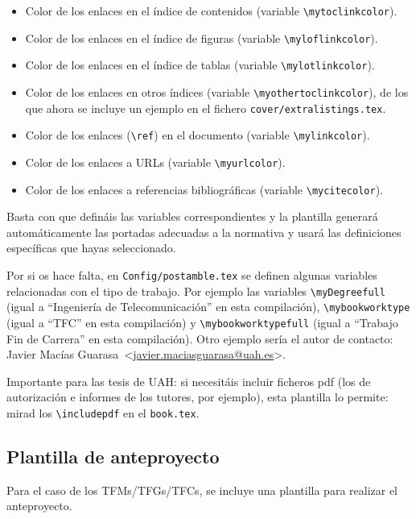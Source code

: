 \documentclass[spanish,openright]{book}
\makeatletter
\newcommand{\myDegree}{GITT}
\newcommand{\myAuthorName}{Javier}
\newcommand{\myAuthorSurname}{Macías Guarasa}
\newcommand{\myAuthorFullName}{\myAuthorName{} \myAuthorSurname{}}
\newcommand{\myAuthorEmail}{javier.maciasguarasa@uah.es}
\newcommand{\myResearchGroup}{GEINTRA}
\newcommand{\myDegreefull}{Ingeniería de Telecomunicación}
\newcommand{\mybookworktype}{TFC}
\newcommand{\mybookworktypefull}{Trabajo Fin de Carrera}
\newcommand{\mybookworktypefull}{Trabajo Fin de Carrera}
\newcommand{\myDegreefull}{Ingeniería Electrónica}
\newcommand{\mybookworktype}{TFC}
\newcommand{\mybookworktypefull}{Trabajo Fin de Carrera}
\newcommand{\mybookworktypefull}{Trabajo Fin de Carrera}
\newcommand{\myDegreefull}{Ingeniería Técnica de Telecomunicación, especialidad en Sistemas Electrónicos}
\newcommand{\mybookworktype}{TFC}
\newcommand{\mybookworktypefull}{Trabajo Fin de Carrera}
\newcommand{\mybookworktypefull}{Trabajo Fin de Carrera}
\newcommand{\myDegreefull}{Ingeniería Técnica de Telecomunicación, especialidad en Sistemas de Telecomunicación}
\newcommand{\mybookworktype}{TFC}
\newcommand{\mybookworktypefull}{Trabajo Fin de Carrera}
\newcommand{\mybookworktypefull}{Trabajo Fin de Carrera}
\newcommand{\myDegreefull}{Ingeniería Técnica Industrial, especialidad en Electrónica Industrial}
\newcommand{\mybookworktype}{TFC}
\newcommand{\mybookworktypefull}{Trabajo Fin de Carrera}
\newcommand{\mybookworktypefull}{Trabajo Fin de Carrera}
\newcommand{\myDegreefull}{Grado en Ingeniería Electrónica de Comunicaciones}
\newcommand{\mybookworktype}{TFG}
\newcommand{\mybookworktypefull}{Trabajo Fin de Grado}
\newcommand{\mybookworktypefull}{Trabajo Fin de Grado}
\newcommand{\myDegreefull}{Grado en Ingeniería en Electrónica y Automática Industrial}
\newcommand{\mybookworktype}{TFG}
\newcommand{\mybookworktypefull}{Trabajo Fin de Grado}
\newcommand{\mybookworktypefull}{Trabajo Fin de Grado}
\newcommand{\myDegreefull}{Grado en Ingeniería en Sistemas de Telecomunicación}
\newcommand{\mybookworktype}{TFG}
\newcommand{\mybookworktypefull}{Trabajo Fin de Grado}
\newcommand{\mybookworktypefull}{Trabajo Fin de Grado}
\newcommand{\myDegreefull}{Grado en Ingeniería en Tecnologías de la Telecomunicación}
\newcommand{\mybookworktype}{TFG}
\newcommand{\mybookworktypefull}{Trabajo Fin de Grado}
\newcommand{\mybookworktypefull}{Trabajo Fin de Grado}
\newcommand{\myDegreefull}{Grado en Ingeniería Telemática}
\newcommand{\mybookworktype}{TFG}
\newcommand{\mybookworktypefull}{Trabajo Fin de Grado}
\newcommand{\mybookworktypefull}{Trabajo Fin de Grado}
\newcommand{\myDegreefull}{Grado en Ingeniería de Computadores}
\newcommand{\mybookworktype}{TFG}
\newcommand{\mybookworktypefull}{Trabajo Fin de Grado}
\newcommand{\mybookworktypefull}{Trabajo Fin de Grado}
\newcommand{\myDegreefull}{Grado en Ingeniería Informática}
\newcommand{\mybookworktype}{TFG}
\newcommand{\mybookworktypefull}{Trabajo Fin de Grado}
\newcommand{\mybookworktypefull}{Trabajo Fin de Grado}
\newcommand{\myDegreefull}{Grado en Sistemas de Información}
\newcommand{\mybookworktype}{TFG}
\newcommand{\mybookworktypefull}{Trabajo Fin de Grado}
\newcommand{\mybookworktypefull}{Trabajo Fin de Grado}
\newcommand{\myDegreefull}{Máster Universitario en Sistemas Electrónicos Avanzados. Sistemas Inteligentes}
\newcommand{\mybookworktype}{TFM}
\newcommand{\mybookworktypefull}{Trabajo Fin de Máster}
\newcommand{\mybookworktypefull}{Trabajo Fin de Máster}
\newcommand{\myDegreefull}{Estudios de Doctorado}
\newcommand{\mybookworktype}{PHDUAH}
\newcommand{\mybookworktypefull}{Tesis Doctoral}
\newcommand{\mybookworktypefull}{Doctoral Thesis}
\newcommand{\myDegreefull}{Doctor Ingeniero de Telecomunicación}
\newcommand{\mybookworktype}{PHDUPM}
\newcommand{\mybookworktypefull}{Tesis Doctoral}
\newcommand{\mybookworktypefull}{Doctoral Thesis}
\newcommand{\myDegreefull}{GEINTRA Research Report}
\newcommand{\mybookworktype}{GEINTRARR}
\newcommand{\mybookworktypefull}{Informe técnico del Grupo de investigación \myResearchGroup{}}
\newcommand{\mybookworktypefull}{\myResearchGroup{} Research Report}
\newcommand{\myDegreefull}{Máster Universitario en Ingeniería de Telecomunicación}
\newcommand{\mybookworktype}{TFM}
\newcommand{\mybookworktypefull}{Trabajo Fin de Máster}
\newcommand{\mybookworktypefull}{Trabajo Fin de Máster}
\newcommand{\myDegreefull}{Máster Universitario en Ingeniería Industrial}
\newcommand{\mybookworktype}{TFM}
\newcommand{\mybookworktypefull}{Trabajo Fin de Máster}
\newcommand{\mybookworktypefull}{Trabajo Fin de Máster}
\newcommand{\myDegreefull}{Grado en Ingeniería en Tecnologías Industriales}
\newcommand{\mybookworktype}{TFG}
\newcommand{\mybookworktypefull}{Trabajo Fin de Grado}
\newcommand{\mybookworktypefull}{Trabajo Fin de Grado}
\newcommand{\myDegreefull}{Grado en Ingeniería en Sistemas de Información}
\newcommand{\mybookworktype}{TFG}
\newcommand{\mybookworktypefull}{Trabajo Fin de Grado}
\newcommand{\mybookworktypefull}{Trabajo Fin de Grado}
\newcommand{\myDegreefull}{Máster Universitario en Ingeniería Electrónica}
\newcommand{\mybookworktype}{TFM}
\newcommand{\mybookworktypefull}{Trabajo Fin de Máster}
\newcommand{\mybookworktypefull}{Trabajo Fin de Máster}
\newcommand{\mybookworktype}{TFG}
\newcommand{\myDegreefull}{ERROR: Defined degree (\myDegree) unknown, check \texttt{config/myconfig.tex}}
\newcommand{\mybookworktypefull}{ERROR: Defined degree (\myDegree) unknown, check \texttt{config/myconfig.tex}}
\newcommand{\contactauthor}{\myAuthorFullName~\textless\href{mailto:\myAuthorEmail}{\myAuthorEmail}\textgreater}
\makeatother
\begin{document}
\begin{itemize}
\item Color de los enlaces en el índice de contenidos (variable
  \texttt{\textbackslash{}mytoclinkcolor}).
\item Color de los enlaces en el índice de figuras (variable
  \texttt{\textbackslash{}myloflinkcolor}).
\item Color de los enlaces en el índice de tablas (variable
  \texttt{\textbackslash{}mylotlinkcolor}).
\item Color de los enlaces en otros índices (variable
  \texttt{\textbackslash{}myothertoclinkcolor}), de los que ahora se
  incluye un ejemplo en el fichero \texttt{cover/extralistings.tex}.
\item Color de los enlaces (\texttt{\textbackslash{}ref}) en el
  documento (variable \texttt{\textbackslash{}mylinkcolor}).
\item Color de los enlaces a URLs (variable
  \texttt{\textbackslash{}myurlcolor}).
\item Color de los enlaces a referencias bibliográficas (variable
  \texttt{\textbackslash{}mycitecolor}).
\end{itemize}

Basta con que defináis las variables correspondientes y la plantilla
generará automáticamente las portadas adecuadas a la normativa y usará
las definiciones específicas que hayas seleccionado.

Por si os hace falta, en \texttt{Config/postamble.tex} se definen
algunas variables relacionadas con el tipo de trabajo. Por ejemplo las
variables \texttt{\textbackslash{}myDegreefull} (igual a
``\myDegreefull'' en esta compilación),
\texttt{\textbackslash{}mybookworktype} (igual a ``\mybookworktype'' en
esta compilación) y \texttt{\textbackslash{}mybookworktypefull} (igual a
``\mybookworktypefull'' en esta compilación). Otro ejemplo sería el
autor de contacto: \contactauthor.

Importante para las tesis de UAH: si necesitáis incluir ficheros pdf
(los de autorización e informes de los tutores, por ejemplo), esta
plantilla lo permite: mirad los \texttt{\textbackslash{}includepdf} en
el \texttt{book.tex}.

\subsection{Plantilla de anteproyecto}
\label{sec:plantilla-de-anteproyecto}

Para el caso de los TFMs/TFGs/TFCs, se incluye una plantilla para
realizar el anteproyecto.
\end{document}
